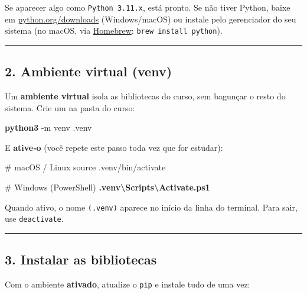 \documentclass[
  brazilian,
  11pt,
]{article}
\newenvironment{Shaded}{\begin{snugshade}}{\end{snugshade}}
\newcommand{\AttributeTok}[1]{\textcolor[rgb]{0.16,0.50,0.73}{#1}}
\newcommand{\BuiltInTok}[1]{\textcolor[rgb]{0.50,0.55,0.55}{#1}}
\newcommand{\CommentTok}[1]{\textcolor[rgb]{0.48,0.49,0.49}{#1}}
\newcommand{\ExtensionTok}[1]{\textcolor[rgb]{0.00,0.60,1.00}{\textbf{#1}}}
\newcommand{\NormalTok}[1]{\textcolor[rgb]{0.81,0.81,0.76}{#1}}
\let\oldtexttt\texttt
\renewcommand{\texttt}[1]{{\color{inlink}\oldtexttt{#1}}}
\begin{document}
Se aparecer algo como \texttt{Python\ 3.11.x}, está pronto. Se não tiver
Python, baixe em
\href{https://www.python.org/downloads/}{python.org/downloads}
(Windows/macOS) ou instale pelo gerenciador do seu sistema (no macOS,
via \href{https://brew.sh}{Homebrew}: \texttt{brew\ install\ python}).

\begin{center}\rule{0.5\linewidth}{0.5pt}\end{center}

\subsection{2. Ambiente virtual (venv)}\label{ambiente-virtual-venv}

Um \textbf{ambiente virtual} isola as bibliotecas do curso, sem bagunçar
o resto do sistema. Crie um na pasta do curso:

\begin{Shaded}
\begin{Highlighting}[]
\ExtensionTok{python3} \AttributeTok{{-}m}\NormalTok{ venv .venv}
\end{Highlighting}
\end{Shaded}

E \textbf{ative‑o} (você repete este passo toda vez que for estudar):

\begin{Shaded}
\begin{Highlighting}[]
\CommentTok{\# macOS / Linux}
\BuiltInTok{source}\NormalTok{ .venv/bin/activate}

\CommentTok{\# Windows (PowerShell)}
\ExtensionTok{.venv\textbackslash{}Scripts\textbackslash{}Activate.ps1}
\end{Highlighting}
\end{Shaded}

Quando ativo, o nome \texttt{(.venv)} aparece no início da linha do
terminal. Para sair, use \texttt{deactivate}.

\begin{center}\rule{0.5\linewidth}{0.5pt}\end{center}

\subsection{3. Instalar as bibliotecas}\label{instalar-as-bibliotecas}

Com o ambiente \textbf{ativado}, atualize o \texttt{pip} e instale tudo
de uma vez:
\end{document}
